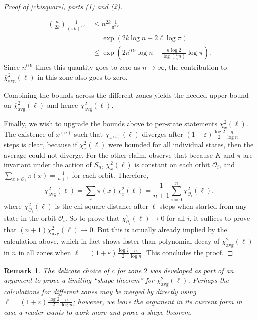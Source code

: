\documentclass[11pt]{article}
\newcommand{\mc}{\mathcal}
\newcounter{r}
\newcounter{s}
\numberwithin{equation}{section}
\newtheorem*{remark}{Remark}
\begin{document}
\begin{proof}[Proof of \cref{chisquare}, parts (1) and (2)]
\begin{itemize}
\begin{align*}
    \binom{n}{2k} \frac{1}{(\pi k)^{2\ell}} &\le n^{2k} \frac{1}{\pi^{2\ell}} \\
    &= \exp\left(2k \log n - 2\ell \log \pi\right) \\
    &\le \exp\left(2n^{0.9} \log n - \frac{n \log 2}{\log\left(\frac{\pi}{4} n\right)} \log \pi\right).
\end{align*}
Since $n^{0.9}$ times this quantity goes to zero as $n \to \infty$, the contribution to $\overline{\chi}_{\text{avg}}^2(\ell)$ in this zone also goes to zero.
\end{itemize}
Combining the bounds across the different zones yields the needed upper bound on $\overline{\chi}_{\text{avg}}^2(\ell)$ and hence $\chi_{\text{avg}}^2(\ell)$.

\medskip

Finally, we wish to upgrade the bounds above to per-state statements $\chi_x^2(\ell)$. The existence of $x^{(n)}$ such that $\chi_{x^{(n)}}(\ell)$ diverges after $(1 - \varepsilon) \frac{\log 2}{2} \frac{n}{\log n}$ steps is clear, because if $\chi_x^2(\ell)$ were bounded for all individual states, then the average could not diverge. For the other claim, observe that because $K$ and $\pi$ are invariant under the action of $S_n$, $\chi_x^2(\ell)$ is constant on each orbit $\mc{O}_i$, and $\sum_{x \in \mc{O}_i} \pi(x) = \frac{1}{n+1}$ for each orbit. Therefore,
\[
    \chi_{\text{avg}}^2(\ell) = \sum_x \pi(x) \chi_x^2(\ell) = \frac{1}{n+1} \sum_{i=0}^n \chi_{\mc{O}_i}^2(\ell),
\]
where $\chi_{\mc{O}_i}^2(\ell)$ is the chi-square distance after $\ell$ steps when started from any state in the orbit $\mc{O}_i$. So to prove that $\chi_{\mc{O}_i}^2(\ell) \to 0$ for all $i$, it suffices to prove that $(n+1)\chi_{\text{avg}}^2(\ell) \to 0$. But this is actually already implied by the calculation above, which in fact shows faster-than-polynomial decay of $\chi_{\text{avg}}^2(\ell)$ in $n$ in all zones when $\ell = (1 + \varepsilon) \frac{\log 2}{2} \frac{n}{\log n}$. This concludes the proof.
\end{proof}

\begin{remark}
The delicate choice of $c$ for zone $2$ was developed as part of an argument to prove a limiting ``shape theorem'' for $\chi_{\text{avg}}^2(\ell)$. Perhaps the calculations for different zones may be merged by directly using $\ell = (1 + \varepsilon) \frac{\log 2}{2} \frac{n}{\log n}$; however, we leave the argument in its current form in case a reader wants to work more and prove a shape theorem.
\end{remark}
\end{document}
